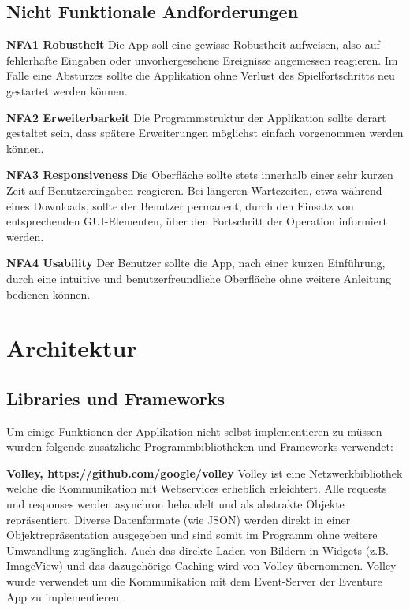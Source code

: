 \documentclass{scrartcl}
\begin{document}
\subsection{Nicht Funktionale Andforderungen}

\textbf{NFA1 Robustheit} \newline
Die App soll eine gewisse Robustheit aufweisen, also auf fehlerhafte Eingaben
oder unvorhergesehene Ereignisse angemessen reagieren. Im Falle eine Absturzes
sollte die Applikation ohne Verlust des Spielfortschritts neu gestartet werden
können.

\textbf{NFA2 Erweiterbarkeit} \newline
Die Programmstruktur der Applikation sollte derart gestaltet sein, dass
spätere Erweiterungen möglichst einfach vorgenommen werden können.

\textbf{NFA3 Responsiveness} \newline
Die Oberfläche sollte stets innerhalb einer sehr kurzen Zeit auf
Benutzereingaben reagieren. Bei längeren Wartezeiten, etwa während eines
Downloads, sollte der Benutzer permanent, durch den Einsatz von entsprechenden
GUI-Elementen, über den Fortschritt der Operation informiert werden.

\textbf{NFA4 Usability} \newline
Der Benutzer sollte die App, nach einer kurzen Einführung, durch eine intuitive
und benutzerfreundliche Oberfläche ohne weitere Anleitung bedienen können.

\newpage

\section{Architektur}

\subsection{Libraries und Frameworks}

Um einige Funktionen der Applikation nicht selbst implementieren zu müssen
wurden folgende zusätzliche Programmbibliotheken und Frameworks verwendet:

\textbf{Volley, https://github.com/google/volley} \newline
Volley ist eine Netzwerkbibliothek welche die Kommunikation mit Webservices
erheblich erleichtert. Alle requests und responses werden asynchron behandelt
und als abstrakte Objekte repräsentiert. Diverse Datenformate (wie JSON) werden
direkt in einer Objektrepräsentation ausgegeben und sind somit im Programm ohne
weitere Umwandlung zugänglich. Auch das direkte Laden von Bildern in Widgets
(z.B. ImageView) und das dazugehörige Caching wird von Volley übernommen. Volley
wurde verwendet um die Kommunikation mit dem Event-Server der Eventure App zu implementieren.
\end{document}
